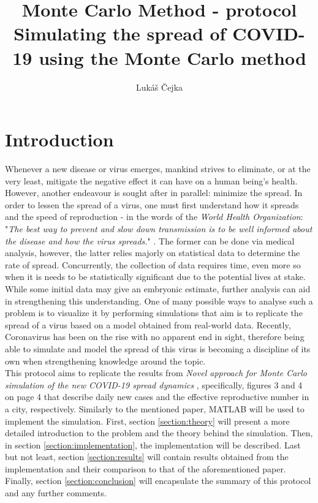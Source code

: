 \documentclass[a4paper]{article}
\newcommand{\code}{\texttt}
\newcommand{\Author}{Lukáš Čejka}
\begin{document}
\title{Monte Carlo Method - protocol \\
\textbf{Simulating the spread of COVID-19 using the Monte Carlo method}}
\author{\Author}
\maketitle

\renewcommand{\code}[1]{\colorbox{codegray}{\texttt{#1}}}

{
	\hypersetup{linkcolor=black}
	\tableofcontents
}


\section{Introduction}
Whenever a new disease or virus emerges, mankind strives to eliminate, or at the very least, mitigate the negative effect it can have on a human being's health. However, another endeavour is sought after in parallel: minimize the spread. In order to lessen the spread of a virus, one must first understand how it spreads and the speed of reproduction - in the words of the \textit{World Health Organization}: "\textit{The best way to prevent and slow down transmission is to be well informed about the disease and how the virus spreads.}" \cite{WHO2021}. The former can be done via medical analysis, however, the latter relies majorly on statistical data to determine the rate of spread. Concurrently, the collection of data requires time, even more so when it is needs to be statistically significant due to the potential lives at stake. While some initial data may give an embryonic estimate, further analysis can aid in strengthening this understanding. One of many possible ways to analyse such a problem is to visualize it by performing simulations that aim is to replicate the spread of a virus based on a model obtained from real-world data. Recently, Coronavirus has been on the rise with no apparent end in sight, therefore being able to simulate and model the spread of this virus is becoming a discipline of its own when strengthening knowledge around the topic. \\

This protocol aims to replicate the results from \textit{Novel approach for Monte Carlo simulation of the new COVID-19 spread dynamics} \cite{Maltezos2021}, specifically, figures 3 and 4 on page 4 that describe daily new cases and the effective reproductive number in a city, respectively. Similarly to the mentioned paper, MATLAB will be used to implement the simulation. First, section \ref{section:theory} will present a more detailed introduction to the problem and the theory behind the simulation. Then, in section \ref{section:implementation}, the implementation will be described. Last but not least, section \ref{section:results} will contain results obtained from the implementation and their comparison to that of the aforementioned paper. Finally, section \ref{section:conclusion} will encapsulate the summary of this protocol and any further comments.
\end{document}
